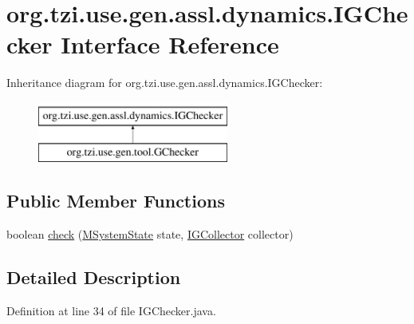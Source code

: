 \hypertarget{interfaceorg_1_1tzi_1_1use_1_1gen_1_1assl_1_1dynamics_1_1_i_g_checker}{\section{org.\-tzi.\-use.\-gen.\-assl.\-dynamics.\-I\-G\-Checker Interface Reference}
\label{interfaceorg_1_1tzi_1_1use_1_1gen_1_1assl_1_1dynamics_1_1_i_g_checker}
}
Inheritance diagram for org.\-tzi.\-use.\-gen.\-assl.\-dynamics.\-I\-G\-Checker\-:\begin{figure}[H]
\begin{center}
\leavevmode
\includegraphics[height=2.000000cm]{interfaceorg_1_1tzi_1_1use_1_1gen_1_1assl_1_1dynamics_1_1_i_g_checker}
\end{center}
\end{figure}
\subsection*{Public Member Functions}
\begin{DoxyCompactItemize}
\item 
boolean \hyperlink{interfaceorg_1_1tzi_1_1use_1_1gen_1_1assl_1_1dynamics_1_1_i_g_checker_af4ac5a8991337b9109d46c643ea1eb1a}{check} (\hyperlink{classorg_1_1tzi_1_1use_1_1uml_1_1sys_1_1_m_system_state}{M\-System\-State} state, \hyperlink{interfaceorg_1_1tzi_1_1use_1_1gen_1_1assl_1_1dynamics_1_1_i_g_collector}{I\-G\-Collector} collector)
\end{DoxyCompactItemize}


\subsection{Detailed Description}


Definition at line 34 of file I\-G\-Checker.\-java.



